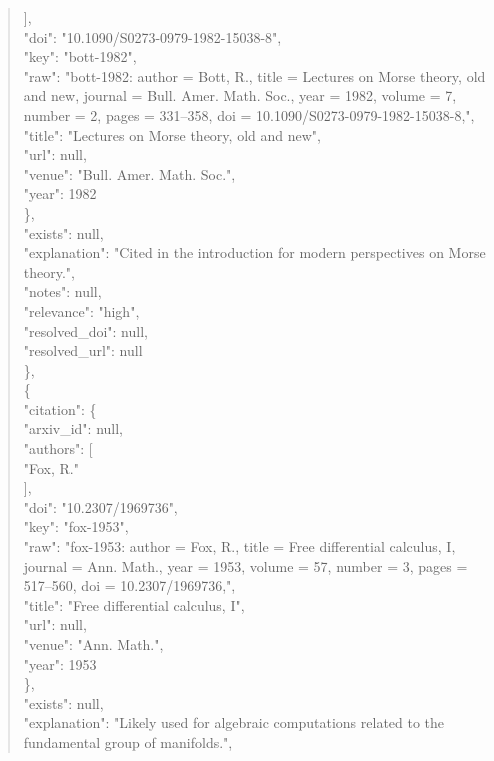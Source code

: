 \documentclass[11pt]{article}
\begin{document}
\begin{quote}
        ],\\
        "doi": "10.1090/S0273-0979-1982-15038-8",\\
        "key": "bott-1982",\\
        "raw": "bott-1982: author = Bott, R., title = Lectures on Morse theory, old and new, journal = Bull. Amer. Math. Soc., year = 1982, volume = 7, number = 2, pages = 331--358, doi = 10.1090/S0273-0979-1982-15038-8,",\\
        "title": "Lectures on Morse theory, old and new",\\
        "url": null,\\
        "venue": "Bull. Amer. Math. Soc.",\\
        "year": 1982\\
      \},\\
      "exists": null,\\
      "explanation": "Cited in the introduction for modern perspectives on Morse theory.",\\
      "notes": null,\\
      "relevance": "high",\\
      "resolved\_doi": null,\\
      "resolved\_url": null\\
    \},\\
    \{\\
      "citation": \{\\
        "arxiv\_id": null,\\
        "authors": [\\
          "Fox, R."\\
        ],\\
        "doi": "10.2307/1969736",\\
        "key": "fox-1953",\\
        "raw": "fox-1953: author = Fox, R., title = Free differential calculus, I, journal = Ann. Math., year = 1953, volume = 57, number = 3, pages = 517--560, doi = 10.2307/1969736,",\\
        "title": "Free differential calculus, I",\\
        "url": null,\\
        "venue": "Ann. Math.",\\
        "year": 1953\\
      \},\\
      "exists": null,\\
      "explanation": "Likely used for algebraic computations related to the fundamental group of manifolds.",\\

\end{quote}
\end{document}
